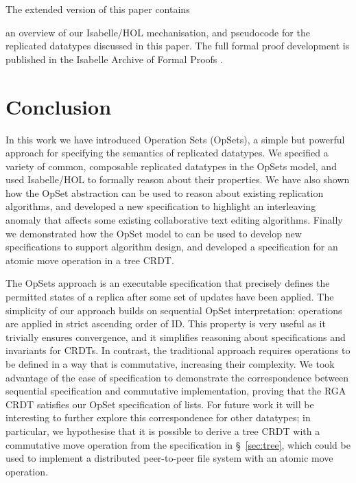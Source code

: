 \documentclass[a4paper,english]{lipics-v2018}
\newif\ifarxiv
\begin{document}
\ifarxiv
  The appendices contain
\else
  The extended version of this paper \cite{ExtendedVersion} contains
\fi
an overview of our Isabelle/HOL mechanisation, and pseudocode for the replicated datatypes discussed in this paper.
The full formal proof development is published in the Isabelle Archive of Formal Proofs \cite{AFP}.







\section{Conclusion}

In this work we have introduced Operation Sets (OpSets), a simple but powerful approach for specifying the semantics of replicated datatypes.
We specified a variety of common, composable replicated datatypes in the OpSets model, and used Isabelle/HOL to formally reason about their properties.
We have also shown how the OpSet abstraction can be used to reason about existing replication algorithms, and developed a new specification to highlight an interleaving anomaly that affects some existing collaborative text editing algorithms.
Finally we demonstrated how the OpSet model to can be used to develop new specifications to support algorithm design, and developed a specification for an atomic move operation in a tree CRDT.

The OpSets approach is an executable specification that precisely defines the permitted states of a replica after some set of updates have been applied.
The simplicity of our approach builds on sequential OpSet interpretation: operations are applied in strict ascending order of ID.
This property is very useful as it trivially ensures convergence, and it simplifies reasoning about specifications and invariants for CRDTs.
In contrast, the traditional approach requires operations to be defined in a way that is commutative, increasing their complexity.
We took advantage of the ease of specification to demonstrate the correspondence between sequential specification and commutative implementation, proving that the RGA CRDT satisfies our OpSet specification of lists.
For future work it will be interesting to further explore this correspondence for other datatypes; in particular, we hypothesise that it is possible to derive a tree CRDT with a commutative move operation from the specification in \S~\ref{sec:tree}, which could be used to implement a distributed peer-to-peer file system with an atomic move operation.
\end{document}
